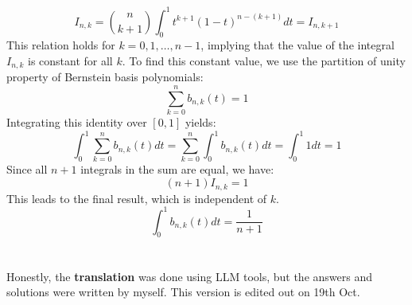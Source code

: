 \documentclass[a4paper]{article}
\begin{document}
\[
I_{n,k} = \binom{n}{k+1} \int_0^1 t^{k+1} (1-t)^{n-(k+1)} dt = I_{n,k+1}
\]
This relation holds for $k = 0, 1, \dots, n-1$, implying that the value of the integral $I_{n,k}$ is constant for all $k$.
To find this constant value, we use the partition of unity property of Bernstein basis polynomials:
\[
\sum_{k=0}^n b_{n,k}(t) = 1
\]
Integrating this identity over $[0,1]$ yields:
\[
\int_0^1 \sum_{k=0}^n b_{n,k}(t) dt = \sum_{k=0}^n \int_0^1 b_{n,k}(t) dt = \int_0^1 1 dt = 1
\]
Since all $n+1$ integrals in the sum are equal, we have:
\[
(n+1) I_{n,k} = 1
\]
This leads to the final result, which is independent of $k$.
\[
\int_0^1 b_{n,k}(t) dt = \frac{1}{n+1}
\]












































\section*{  }
Honestly, the \textbf{translation} was done using LLM tools, but the answers and solutions were written by myself.
This version is edited out on 19th Oct.


\end{document}
